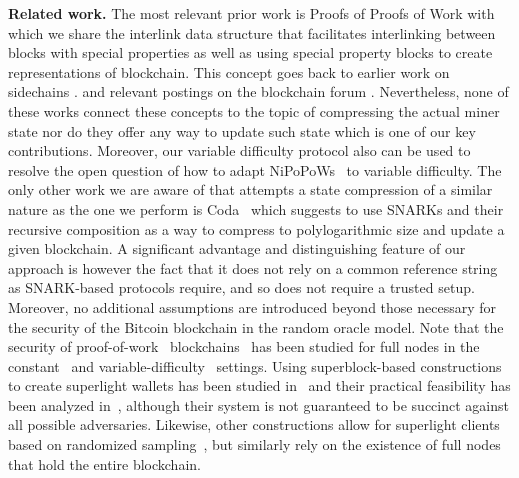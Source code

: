 \noindent
\textbf{Related work.}
The most relevant prior work is Proofs of Proofs of Work
\cite{popow,nipopows} with which we share the interlink
data structure that facilitates interlinking between blocks
with special properties as well as using special property blocks to
create representations of blockchain. This concept goes back
to earlier work on sidechains \cite{sidechains,pow-sidechains,pos-sidechains}.
and relevant postings on the blockchain forum
\cite{highway}. Nevertheless, none of these works connect
these concepts to the topic of compressing the actual miner state
nor do they offer any  way to update such state which is one of our key
contributions. Moreover, our variable difficulty protocol also can be used to resolve
the open question of how to adapt NiPoPoWs~\cite{nipopows} to variable difficulty.
The only other work we are aware of that
attempts a state compression of a similar nature as the one we perform
is Coda~\cite{coda}  which suggests to use SNARKs and their recursive composition
\cite{snarks,recursive-snarks} as a way to
compress to polylogarithmic size  and update a given blockchain.
A significant advantage and distinguishing feature of our approach is however the fact that it does
not rely on a common reference string as SNARK-based protocols
require, and so does not require a trusted setup. Moreover, no additional assumptions are introduced
beyond those necessary for the security of the Bitcoin blockchain
in the random oracle model.
Note that the security of proof-of-work~\cite{pow}
blockchains~\cite{bitcoin} has been studied for full nodes in the
constant~\cite{backbone} and variable-difficulty~\cite{varbackbone}
settings.
Using superblock-based constructions to create superlight wallets has
been studied in~\cite{popow,nipopows} and their practical feasibility has been
analyzed in~\cite{gtklocker,compactsuperblocks}, although their system is not
guaranteed to be succinct against all possible adversaries.
Likewise, other constructions allow for superlight
clients based on randomized sampling~\cite{flyclient}, but similarly
rely on the existence of full nodes that hold
the entire blockchain.
